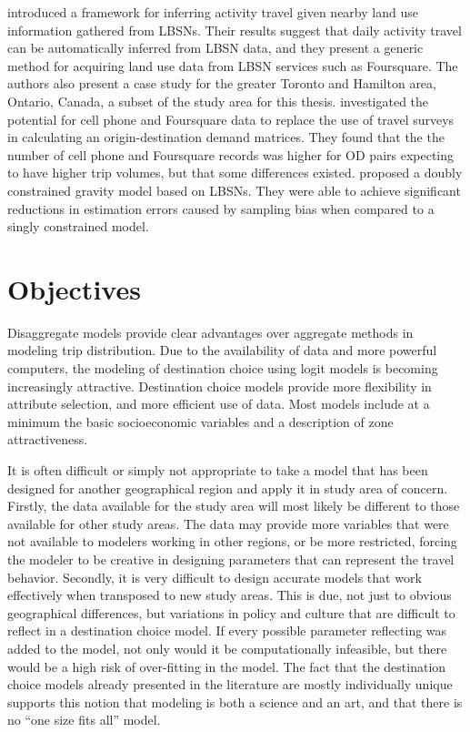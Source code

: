 \textcite{abdulazim2015framework} introduced a framework for inferring activity travel given nearby land use information gathered from LBSNs. Their results suggest that daily activity travel can be automatically inferred from LBSN data, and they present a generic method for acquiring land use data from LBSN services such as Foursquare. The authors also present a case study for the  greater Toronto and Hamilton area, Ontario, Canada, a subset of the study area for this thesis. \textcite{sa2015origin} investigated the potential for cell phone and Foursquare data to replace the use of travel surveys in calculating an origin-destination demand matrices. They found that the the number of cell phone and Foursquare records was higher for OD pairs expecting to have higher trip volumes, but that some differences existed.
\textcite{jin2014location} proposed a doubly constrained gravity model based on LBSNs. They were able to achieve significant reductions in estimation errors caused by sampling bias when compared to a singly constrained model.

\section{Objectives}
Disaggregate models provide clear advantages over aggregate methods in modeling trip distribution. Due to the availability of data and more powerful computers, the modeling of destination choice using logit models is becoming increasingly attractive. Destination choice models provide more flexibility in attribute selection, and more efficient use of data. Most models include at a minimum the basic socioeconomic variables and a description of zone attractiveness. 

It is often difficult or simply not appropriate to take a model that has been designed for another geographical region and apply it in study area of concern. Firstly, the data available for the study area will most likely be different to those available for other study areas. The data may provide more variables that were not available to modelers working in other regions, or be more restricted, forcing the modeler to be creative in designing parameters that can represent the travel behavior. Secondly, it is very difficult to design accurate models that work effectively when transposed to new study areas. This is due, not just to obvious geographical differences, but variations in policy and culture that are difficult to reflect in a destination choice model. If every possible parameter reflecting was added to the model, not only would it be computationally infeasible, but there would be a high risk of over-fitting in the model. The fact that the destination choice models already presented in the literature are mostly individually unique supports this notion that modeling is both a science and an art, and that there is no \enquote{one size fits all} model.

